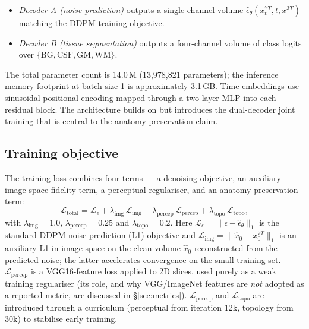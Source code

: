 \documentclass[10pt,twocolumn,a4paper]{article}
\begin{document}
\begin{itemize}\itemsep1pt
\item \emph{Decoder A (noise prediction)} outputs a single-channel
volume $\hat\epsilon_\theta(x_t^{7T},t,x^{3T})$ matching the
DDPM training objective.
\item \emph{Decoder B (tissue segmentation)} outputs a four-channel
volume of class logits over $\{\text{BG},\text{CSF},\text{GM},\text{WM}\}$.
\end{itemize}

The total parameter count is 14.0\,M (13{,}978{,}821 parameters); the inference memory footprint at
batch size 1 is approximately 3.1\,GB. Time embeddings use sinusoidal
positional encoding mapped through a two-layer MLP into each residual
block. The architecture builds on \cite{ronneberger2015unet,
ho2020denoising,vaswani2017attention} but introduces the dual-decoder
joint training that is central to the anatomy-preservation claim.

\subsection{Training objective}
\label{sec:loss}

The training loss combines four terms --- a denoising objective, an
auxiliary image-space fidelity term, a perceptual regulariser, and an
anatomy-preservation term:
%
\begin{equation}
\mathcal{L}_\text{total} = \mathcal{L}_{\epsilon} + \lambda_\text{img}\,\mathcal{L}_\text{img} + \lambda_\text{percep}\,\mathcal{L}_\text{percep} + \lambda_\text{topo}\,\mathcal{L}_\text{topo},
\end{equation}
%
with $\lambda_\text{img}=1.0$, $\lambda_\text{percep}=0.25$ and
$\lambda_\text{topo}=0.2$. Here
$\mathcal{L}_{\epsilon}=\lVert\epsilon-\hat\epsilon_\theta\rVert_1$ is the
standard DDPM noise-prediction (L1) objective and
$\mathcal{L}_\text{img}=\lVert\hat{x}_0-x_0^{7T}\rVert_1$ is an auxiliary
L1 in image space on the clean volume $\hat{x}_0$ reconstructed from the
predicted noise; the latter accelerates convergence on the small
training set. $\mathcal{L}_\text{percep}$ is a VGG16-feature loss
\cite{simonyan2014vgg} applied to 2D slices, used purely as a weak
training regulariser (its role, and why VGG/ImageNet features are
\emph{not} adopted as a reported metric, are discussed in
\S\ref{sec:metrics}). $\mathcal{L}_\text{percep}$ and
$\mathcal{L}_\text{topo}$ are introduced through a curriculum
(perceptual from iteration 12k, topology from 30k) to stabilise early
training.
\end{document}
